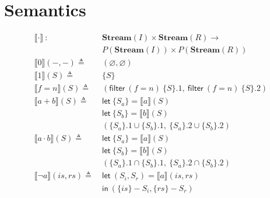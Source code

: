 \documentclass[12pt, letterpaper]{article}
\let\emptyset\varnothing
\newcommand\interp[1]{\llbracket #1 \rrbracket}
\begin{document}
\section{Semantics}
    \begin{align*}
        \interp{ \cdot }\ 
            :\ \ &
            \mathbf{Stream}(I)\times \mathbf{Stream}(R) \rightarrow \\
            & P(\mathbf{Stream}(I))\times P(\mathbf{Stream}(R)) 
            \\
        \interp{ 0 }(-, -)
            \triangleq\ &
            (\emptyset , \emptyset)
            \\ %
        \interp{ 1 }(S)
            \triangleq\ &
            \{S\}
            \\
        \interp{ f=n }(S)
            \triangleq\ &
            (\mathsf{filter}\ (f=n)\ \{S\}.1,\
             \mathsf{filter}\ (f=n)\ \{S\}.2) 
            \\
        \interp{ a + b }(S)
             \triangleq\ &
             \mathsf{let}\ \{S_a\} = \interp{ a }(S) \\
            &\mathsf{let}\ \{S_b\} = \interp{ b }(S) \\
            &(\{S_a\}.1 \cup \{S_b\}.1,\ \{S_a\}.2 \cup \{S_b\}.2)
            \\
        \interp { a \cdot b }(S)
             \triangleq\ &
             \mathsf{let}\ \{S_a\} = \interp { a }(S) \\
            &\mathsf{let}\ \{S_b\} = \interp { b }(S) \\
            &(\{S_a\}.1 \cap \{S_b\}.1,\ \{S_a\}.2 \cap \{S_b\}.2)
            \\
        \interp { \neg a }(\mathit{is}, \mathit{rs})
            \triangleq\ &
            \mathsf{let}\ (S_i, S_r) = \interp {a}(\mathit{is}, \mathit{rs}) \\
            &\mathsf{in}\ (\{\mathit{is}\} - S_i, \{\mathit{rs}\} - S_r)
            \\

\end{align*}
\end{document}
